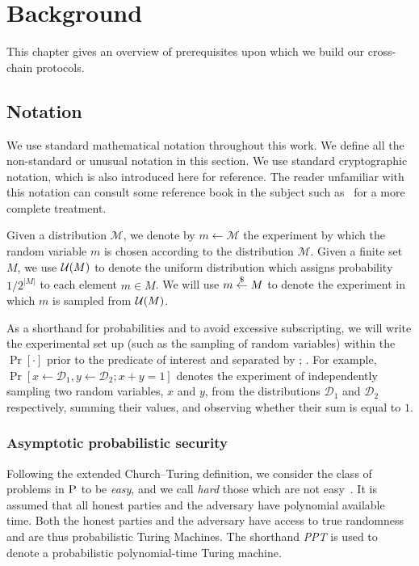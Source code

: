 \chapter{Background}\label{chapter:background}

This chapter gives an overview of prerequisites upon which we build our
cross-chain protocols.

\section{Notation}
We use standard mathematical notation throughout this work. We define all the
non-standard or unusual notation in this section. We use standard cryptographic
notation, which is also introduced here for reference. The reader unfamiliar
with this notation can consult some reference book in the subject such
as~\cite{katz} for a more complete treatment.

Given a distribution $\mathcal{M}$, we denote by $m \gets \mathcal{M}$ the experiment by which the random variable $m$ is chosen according to the distribution $\mathcal{M}$. Given a finite set $M$, we use $\mathcal{U}(M)$ to denote the uniform distribution which assigns probability $1 / 2^{|M|}$ to each element $m \in M$. We will use $m \overset{\$}{\gets} M$ to denote the experiment in which $m$ is sampled from $\mathcal{U}(M)$.

As a shorthand for probabilities and to avoid excessive subscripting, we will write the experimental set up (such as the sampling of random variables) within the $\Pr[\cdot]$ prior to the predicate of interest and separated by $;\,$. For example, $\Pr[x \gets \mathcal{D}_1, y \gets \mathcal{D}_2; x + y = 1]$ denotes the experiment of independently sampling two random variables, $x$ and $y$, from the distributions $\mathcal{D}_1$ and $\mathcal{D}_2$ respectively, summing their values, and observing whether their sum is equal to $1$.

\subsection{Asymptotic probabilistic security}
Following the extended Church--Turing definition, we consider the class of
problems in $\textsc{P}$ to be \emph{easy}, and we call \emph{hard} those which
are not easy~\cite{sipser}. It is assumed that all honest parties and the adversary have polynomial available time. Both the honest parties and the adversary have access to true randomness and are thus probabilistic Turing Machines.
The shorthand \emph{PPT} is used to denote a probabilistic polynomial-time
Turing machine.

